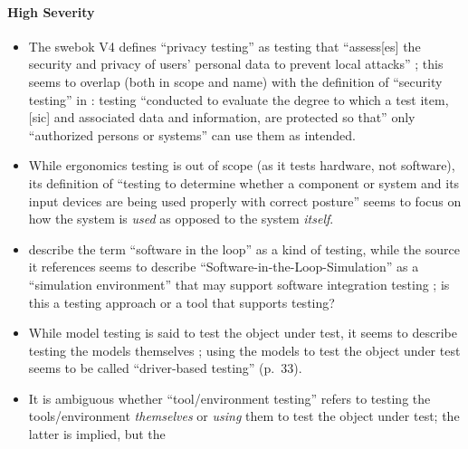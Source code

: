 \ifnotpaper\paragraph{High Severity}\fi
\begin{itemize}
      \item %
            The \acs{swebok} V4 defines ``privacy testing'' as testing that
            ``assess[es] the security and privacy of users' personal data to
            prevent local attacks'' \citep[p.~5-10]{SWEBOK2024}; this seems to
            overlap (both in scope and name) with
            the definition of ``security testing'' in \citep{IEEE2022}: testing
            ``conducted to evaluate the degree to which a test item, [sic] and
            associated data and information, are protected so that'' only
            ``authorized persons or systems'' can use them as intended.
            \ifnotpaper
      \item %
            While ergonomics testing is out of scope (as it tests hardware, not
            software), its definition of ``testing to determine whether a
            component or system and its input devices are being used properly
            with correct posture'' \citepISTQB{} seems to focus on how the
            system is \emph{used} as opposed to the system \emph{itself}.
      \item %
            \citetISTQB{} describe the term ``software in the loop'' as a
            kind of testing, while the source it references seems to describe
            ``Software-in-the-Loop-Simulation'' as a ``simulation environment''
            that may support software integration testing
            \citep[p.~153]{SPICE2022}; is this a testing approach or a tool
            that supports testing?
      \item %
            While model testing is said to test the object under test,
            it seems to describe testing the models themselves
            \citet[p.~20]{Firesmith2015}; using the models to test the object
            under test seems to be called ``driver-based testing'' (p.~33).\fi
      \item %
            It is ambiguous whether ``tool/environment testing'' refers to
            testing the tools/environment \emph{themselves} or \emph{using}
            them to test the object under test; the latter is implied, but the

\end{itemize}
